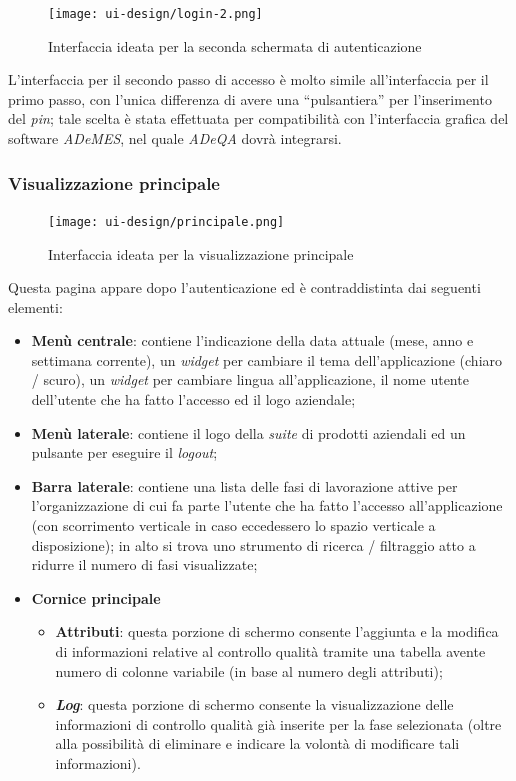\begin{figure}[H]
    \centering
    \texttt{[image: ui-design/login-2.png]}
    \caption{Interfaccia ideata per la seconda schermata di autenticazione}
\end{figure}
L’interfaccia per il secondo passo di accesso è molto simile all’interfaccia per il primo passo, con l’unica differenza di avere una “pulsantiera” per l’inserimento del \textit{pin}; tale scelta è stata effettuata per compatibilità con l’interfaccia grafica del software \textit{ADeMES}, nel quale \textit{ADeQA} dovrà integrarsi.

\subsubsection*{Visualizzazione principale}

\begin{figure}[H]
    \centering
    \texttt{[image: ui-design/principale.png]}
    \caption{Interfaccia ideata per la visualizzazione principale}
\end{figure}
Questa pagina appare dopo l'autenticazione ed è contraddistinta dai seguenti elementi:
\begin{itemize}
    \item \textbf{Menù centrale}: contiene l’indicazione della data attuale (mese, anno e settimana corrente), un \textit{widget} per cambiare il tema dell’applicazione (chiaro / scuro), un \textit{widget} per cambiare lingua all’applicazione, il nome utente dell’utente che ha fatto l’accesso ed il logo aziendale;
    \item \textbf{Menù laterale}: contiene il logo della \textit{suite} di prodotti aziendali ed un pulsante per eseguire il \textit{logout};
    \item \textbf{Barra laterale}: contiene una lista delle fasi di lavorazione attive per l’organizzazione di cui fa parte l’utente che ha fatto l’accesso all’applicazione (con scorrimento verticale in caso eccedessero lo spazio verticale a disposizione);
                                in alto si trova uno strumento di ricerca / filtraggio atto a ridurre il numero di fasi visualizzate;
    \item \textbf{Cornice principale}
        \begin{itemize}
            \item \textbf{Attributi}: questa porzione di schermo consente l’aggiunta e la modifica di informazioni relative al controllo qualità tramite una tabella avente numero di colonne variabile (in base al numero degli attributi);
            \item \textbf{\textit{Log}}: questa porzione di schermo consente la visualizzazione delle informazioni di controllo qualità già inserite per la fase selezionata (oltre alla possibilità di eliminare e indicare la volontà di modificare tali informazioni).
        \end{itemize}
\end{itemize}

